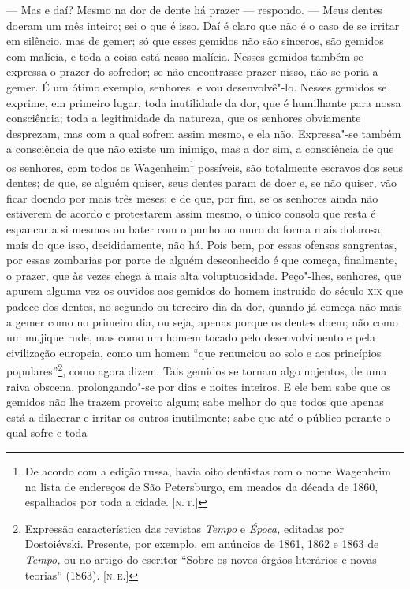 --- Mas e daí? Mesmo na dor de dente há prazer --- respondo. --- Meus dentes
doeram um mês inteiro; sei o que é isso. Daí é claro que não é o caso de
se irritar em silêncio, mas de gemer; só que esses gemidos não são
sinceros, são gemidos com malícia, e toda a coisa está nessa malícia.
Nesses gemidos também se expressa o prazer do sofredor; se não
encontrasse prazer nisso, não se poria a gemer. É um ótimo exemplo,
senhores, e vou desenvolvê"-lo. Nesses gemidos se exprime, em primeiro
lugar, toda inutilidade da dor, que é humilhante para nossa consciência;
toda a legitimidade da natureza, que os senhores obviamente desprezam,
mas com a qual sofrem assim mesmo, e ela não. Expressa"-se também a
consciência de que não existe um inimigo, mas a dor sim, a consciência
de que os senhores, com todos os Wagenheim\footnote{De acordo com a
  edição russa, havia oito dentistas com o nome Wagenheim na lista de
  endereços de São Petersburgo, em meados da década de 1860, espalhados
  por toda a cidade. {[}\textsc{n.\,t.}{]}} possíveis, são totalmente escravos dos
seus dentes; de que, se alguém quiser, seus dentes param de doer e, se
não quiser, vão ficar doendo por mais três meses; e de que, por fim, se
os senhores ainda não estiverem de acordo e protestarem assim mesmo, o
único consolo que resta é espancar a si mesmos ou bater com o punho no
muro da forma mais dolorosa; mais do que isso, decididamente, não há.
Pois bem, por essas ofensas sangrentas, por essas zombarias por parte de
alguém desconhecido é que começa, finalmente, o prazer, que às vezes
chega à mais alta voluptuosidade. Peço"-lhes, senhores, que apurem alguma
vez os ouvidos aos gemidos do homem instruído do século \textsc{xix} que padece
dos dentes, no segundo ou terceiro dia da dor, quando já começa não mais
a gemer como no primeiro dia, ou seja, apenas porque os dentes doem; não
como um mujique rude, mas como um homem tocado pelo desenvolvimento e
pela civilização europeia, como um homem ``que renunciou ao solo e aos
princípios populares''\footnote{Expressão característica das revistas
  \emph{Tempo} e \emph{Época,} editadas por Dostoiévski. Presente, por
  exemplo, em anúncios de 1861, 1862 e 1863 de \emph{Tempo,} ou no
  artigo do escritor ``Sobre os novos órgãos literários e novas
  teorias'' (1863). {[}\textsc{n.\,e.}{]}}, como agora dizem. Tais gemidos se
tornam algo nojentos, de uma raiva obscena, prolongando"-se por dias e
noites inteiros. E ele bem sabe que os gemidos não lhe trazem proveito
algum; sabe melhor do que todos que apenas está a dilacerar e irritar os
outros inutilmente; sabe que até o público perante o qual sofre e toda
